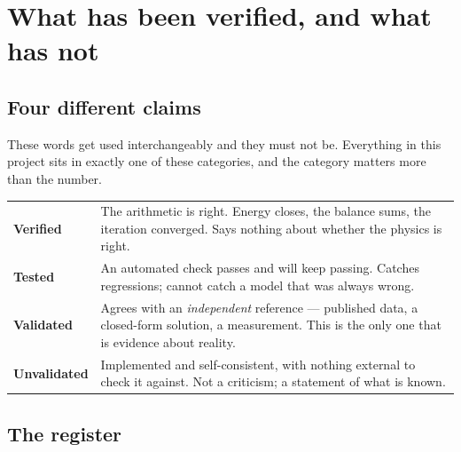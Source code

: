 \documentclass[11pt,a4paper]{report}
\begin{document}
\chapter{What has been verified, and what has not}
\label{ch:vandv}

\section{Four different claims}
\label{sec:vandv}

These words get used interchangeably and they must not be. Everything
in this project sits in exactly one of these categories, and the
category matters more than the number.

\begin{center}
\small
\begin{tabular}{@{}p{3.3cm}p{10.3cm}@{}}
\toprule
\textbf{Verified} & The arithmetic is right. Energy closes, the balance
sums, the iteration converged. Says nothing about whether the physics
is right. \\[3pt]
\textbf{Tested} & An automated check passes and will keep passing.
Catches regressions; cannot catch a model that was always wrong. \\[3pt]
\textbf{Validated} & Agrees with an \emph{independent} reference ---
published data, a closed-form solution, a measurement. This is the only
one that is evidence about reality. \\[3pt]
\textbf{Unvalidated} & Implemented and self-consistent, with nothing
external to check it against. Not a criticism; a statement of what is
known. \\
\bottomrule
\end{tabular}
\end{center}

\section{The register}
\end{document}
